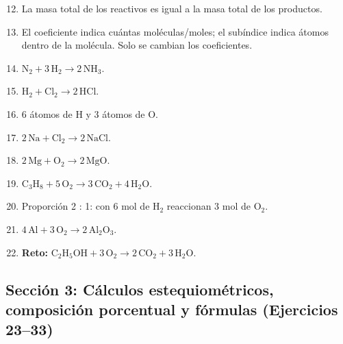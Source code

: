 \documentclass[12pt, letterpaper]{article}
\begin{document}
  \begin{enumerate}[leftmargin=*, label=\textbf{\arabic*.}]
    \setcounter{enumi}{11}
    \item La masa total de los reactivos es igual a la masa total de los productos.
    \item El coeficiente indica cuántas moléculas/moles; el subíndice indica átomos dentro de la molécula. Solo se cambian los coeficientes.
    \item $\text{N}_2 + 3\,\text{H}_2 \rightarrow 2\,\text{NH}_3$.
    \item $\text{H}_2 + \text{Cl}_2 \rightarrow 2\,\text{HCl}$.
    \item 6 átomos de H y 3 átomos de O.
    \item $2\,\text{Na} + \text{Cl}_2 \rightarrow 2\,\text{NaCl}$.
    \item $2\,\text{Mg} + \text{O}_2 \rightarrow 2\,\text{MgO}$.
    \item $\text{C}_3\text{H}_8 + 5\,\text{O}_2 \rightarrow 3\,\text{CO}_2 + 4\,\text{H}_2\text{O}$.
    \item Proporción 2 : 1: con 6 mol de $\text{H}_2$ reaccionan 3 mol de $\text{O}_2$.
    \item $4\,\text{Al} + 3\,\text{O}_2 \rightarrow 2\,\text{Al}_2\text{O}_3$.
    \item \textbf{Reto:} $\text{C}_2\text{H}_5\text{OH} + 3\,\text{O}_2 \rightarrow 2\,\text{CO}_2 + 3\,\text{H}_2\text{O}$.
  \end{enumerate}

  \subsection*{Sección 3: Cálculos estequiométricos, composición porcentual y fórmulas (Ejercicios 23--33)}
\end{document}
